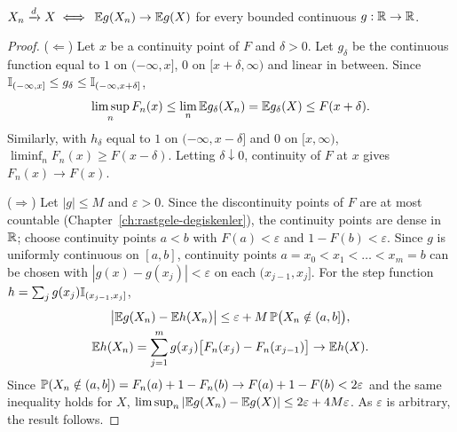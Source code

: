 \documentclass[main.tex]{subfiles}
\begin{document}
\begin{lemma}\label{lem:portmanteau}
$X_n\dto X\iff$ $\E g(X_n)\to\E g(X)$ for every bounded continuous $g:\R\to\R$.
\end{lemma}
\begin{proof}
($\Leftarrow$) Let $x$ be a continuity point of $F$ and $\delta>0$. Let $g_\delta$ be the continuous function equal to $1$ on $(-\infty,x]$, $0$ on $[x+\delta,\infty)$ and linear in between. Since $\I_{(-\infty,x]}\le g_\delta\le\I_{(-\infty,x+\delta]}$,
\[
\limsup_n F_n(x)\le\lim_n\E g_\delta(X_n)=\E g_\delta(X)\le F(x+\delta).
\]
Similarly, with $h_\delta$ equal to $1$ on $(-\infty,x-\delta]$ and $0$ on $[x,\infty)$, $\liminf_n F_n(x)\ge F(x-\delta)$. Letting $\delta\downarrow0$, continuity of $F$ at $x$ gives $F_n(x)\to F(x)$.

($\Rightarrow$) Let $|g|\le M$ and $\varepsilon>0$. Since the discontinuity points of $F$ are at most countable (Chapter~\ref{ch:rastgele-degiskenler}), the continuity points are dense in $\R$; choose continuity points $a<b$ with $F(a)<\varepsilon$ and $1-F(b)<\varepsilon$. Since $g$ is uniformly continuous on $[a,b]$, continuity points $a=x_0<x_1<\dots<x_m=b$ can be chosen with $|g(x)-g(x_j)|<\varepsilon$ on each $(x_{j-1},x_j]$. For the step function $h=\sum_j g(x_j)\I_{(x_{j-1},x_j]}$,
\begin{gather*}
\big|\E g(X_n)-\E h(X_n)\big|\le\varepsilon+M\,\P\big(X_n\notin(a,b]\big),\\
\E h(X_n)=\sum_{j=1}^m g(x_j)\big[F_n(x_j)-F_n(x_{j-1})\big]\to\E h(X).
\end{gather*}
Since $\P(X_n\notin(a,b])=F_n(a)+1-F_n(b)\to F(a)+1-F(b)<2\varepsilon$ and the same inequality holds for $X$, $\limsup_n|\E g(X_n)-\E g(X)|\le2\varepsilon+4M\varepsilon$. As $\varepsilon$ is arbitrary, the result follows.
\end{proof}
\end{document}
